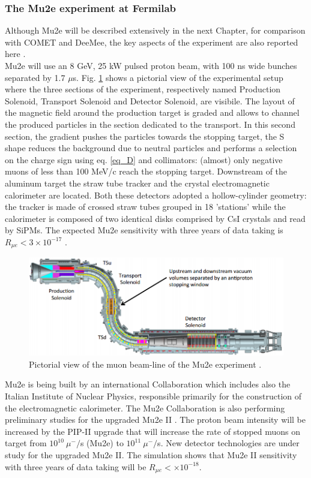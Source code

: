 \documentclass[12pt,a4paper,openright, oneside, titlepage]{book} %
\begin{document}
\subsubsection{The Mu2e experiment at Fermilab}
Although Mu2e will be described extensively in the next Chapter, for comparison with COMET and DeeMee, the key aspects of the experiment are also reported here \cite{bob_mu2e}\cite{Manolis}.\\
Mu2e will use an 8 GeV, 25 kW pulsed proton beam, with 100 ns wide bunches separated by 1.7 $\mu$s.  
Fig. \ref{_MuonBeamline} shows a pictorial view of the experimental setup where the three sections of the experiment, respectively named Production Solenoid, Transport Solenoid and Detector Solenoid, are visibile.  
The layout of the magnetic field around the production target is graded and allows to channel the produced particles in the section dedicated to the transport. 
In this second section, the gradient pushes the particles towards the stopping target, the S shape reduces the background due to neutral particles and performs a selection on the charge sign using eq. \ref{eq_D} and collimators: (almost) only negative muons of less than 100 MeV/c reach the stopping target. 
Downstream of the aluminum target the straw tube tracker and the crystal electromagnetic calorimeter are located. 
Both these detectors adopted a hollow-cylinder geometry: the tracker is made of crossed straw tubes grouped in 18 'stations' while the calorimeter is composed of two identical disks comprised by CsI crystals and read by SiPMs.
The expected Mu2e sensitivity with three years of data taking is $R_{\mu e}<3\times10^{-17}$ \cite{MTDR}.

\begin{figure}[h!]
\centering
\includegraphics[scale=0.8]{MuonBeamline}
\caption[Mu2e experiment]{Pictorial view of the muon beam-line of the Mu2e experiment \cite{MTDR}.}
\label{_MuonBeamline}
\end{figure}

\noindent
Mu2e is being built by an international Collaboration which includes also the Italian Institute of Nuclear Physics, responsible primarily for the construction of the electromagnetic calorimeter.
The Mu2e Collaboration is also performing preliminary studies for the upgraded Mu2e II \cite{Mu2e_II:2018}. 
The proton beam intensity will be increased by the PIP-II upgrade \cite{PIP_II:2018} that will increase the rate of stopped muons on target from $10^{10}\ \mu^-/$s (Mu2e) to $10^{11}\ \mu^-/$s. 
New detector technologies are under study for the upgraded Mu2e II.
The simulation shows that Mu2e II sensitivity with three years of data taking will be $R_{\mu e} < \times10^{-18}$.
\end{document}

